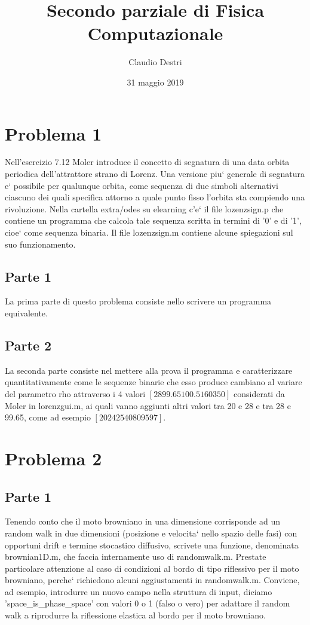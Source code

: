 \documentclass[a4paper,11pt]{article}
\title{Secondo parziale di Fisica Computazionale}
\author{Claudio Destri}
\date{31 maggio 2019}
\begin{document}
\maketitle

\section{Problema 1}
Nell'esercizio 7.12 Moler introduce il concetto di segnatura di una data orbita periodica dell'attrattore strano di Lorenz. Una versione piu` generale di segnatura e` possibile per qualunque orbita, come sequenza di due simboli alternativi ciascuno dei quali specifica attorno a quale punto fisso l'orbita sta compiendo una rivoluzione. Nella cartella extra/odes su elearning c'e` il file lozenzsign.p che contiene un programma che calcola tale sequenza scritta in termini di '0' e di '1', cioe` come sequenza binaria. Il file lozenzsign.m contiene alcune spiegazioni sul suo funzionamento.
\subsection{Parte 1}
La prima parte di questo problema consiste nello scrivere un programma equivalente.
\subsection{Parte 2}
La seconda parte consiste nel mettere alla prova il programma e caratterizzare quantitativamente come le sequenze binarie che esso produce cambiano al variare del parametro rho attraverso i 4 valori $ [28 99.65 100.5 160 350]$ considerati da Moler in lorenzgui.m, ai quali vanno aggiunti altri valori tra 20 e 28 e tra 28 e 99.65, come ad esempio $ [20 24 25 40 80 95 97]$.

\section{Problema 2}
\subsection{Parte 1}
Tenendo conto che il moto browniano in una dimensione corrisponde ad un random walk in due dimensioni (posizione e velocita` nello spazio delle fasi) con opportuni drift e termine stocastico diffusivo, scrivete una funzione, denominata brownian1D.m, che faccia internamente uso di randomwalk.m. Prestate particolare attenzione al caso di condizioni al bordo di tipo riflessivo per il moto browniano, perche` richiedono alcuni aggiustamenti in randomwalk.m. Conviene, ad esempio, introdurre un nuovo campo nella struttura di input, diciamo 'space\_is\_phase\_space' con valori 0 o 1 (falso o vero) per adattare il random walk a riprodurre la riflessione elastica al bordo per il moto browniano.
\end{document}
